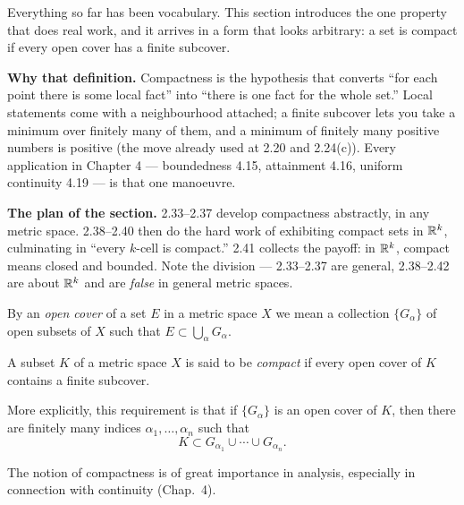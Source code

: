 
\begin{signpost}
Everything so far has been vocabulary. This section introduces the one property
that does real work, and it arrives in a form that looks arbitrary: a set is
compact if every open cover has a finite subcover.

\smallskip
\textbf{Why that definition.} Compactness is the hypothesis that converts
``for each point there is some local fact'' into ``there is one fact for the
whole set.'' Local statements come with a neighbourhood attached; a finite
subcover lets you take a minimum over finitely many of them, and a minimum of
finitely many positive numbers is positive (the move already used at 2.20 and
2.24(c)). Every application in Chapter 4 --- boundedness 4.15, attainment 4.16,
uniform continuity 4.19 --- is that one manoeuvre.

\smallskip
\textbf{The plan of the section.} 2.33--2.37 develop compactness abstractly, in
any metric space. 2.38--2.40 then do the hard work of exhibiting compact sets
in $\mathbb{R}^k$, culminating in ``every $k$-cell is compact.'' 2.41 collects the
payoff: in $\mathbb{R}^k$, compact means closed and bounded. Note the division ---
2.33--2.37 are general, 2.38--2.42 are about $\mathbb{R}^k$ and are \emph{false} in
general metric spaces.
\end{signpost}

By an \emph{open cover} of a set $E$ in a metric space $X$ we mean a collection
$\{G_\alpha\}$ of open subsets of $X$ such that $E \subset \bigcup_\alpha
G_\alpha$.

A subset $K$ of a metric space $X$ is said to be \emph{compact} if every open
cover of $K$ contains a finite subcover.

More explicitly, this requirement is that if $\{G_\alpha\}$ is an open cover of
$K$, then there are finitely many indices $\alpha_1,\dots,\alpha_n$ such that
\[ K \subset G_{\alpha_1} \cup \cdots \cup G_{\alpha_n}. \]

The notion of compactness is of great importance in analysis, especially in
connection with continuity (Chap.\ 4).

